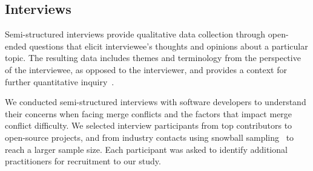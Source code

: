 %


\subsection{Interviews}\label{interviews}

Semi-structured interviews provide qualitative data collection through open-ended questions that elicit interviewee's thoughts and opinions about a particular topic.
The resulting data includes themes and terminology from the perspective of the interviewee, as opposed to the interviewer, and provides a context for further quantitative inquiry~\cite{easterbrook2008selecting}.

We conducted semi-structured interviews with software developers to understand their concerns when facing merge conflicts and the factors that impact merge conflict difficulty.
We selected interview participants from top contributors to open-source projects, and from industry contacts using snowball sampling~\cite{goodman1961snowball} to reach a larger sample size.
Each participant was asked to identify additional practitioners for recruitment to our study.

